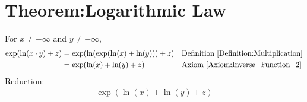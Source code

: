 \documentclass[12pt,a4paper]{report}
\begin{document}
\section{Theorem:Logarithmic Law}
\label{Theorem:Logarithmic_Law}
For $x \neq -\infty$ and $y \neq -\infty$,
\begin{align*}
\exp(\ln(x \cdot y) + z)
&= \exp(\ln(\exp(\ln(x) + \ln(y))) +z)
&& \text{Definition \ref{Definition:Multiplication}} \\
&= \exp(\ln(x) + \ln(y) +z)
&& \text{Axiom \ref{Axiom:Inverse_Function_2}} \\
\end{align*}
Reduction:
\begin{align*}
\exp(\ln(x) + \ln(y) +z)
\end{align*}
\end{document}
